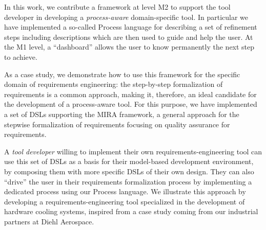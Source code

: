 In this work, we contribute a framework at level M2 to support the tool developer
in developing a \emph{process-aware} domain-specific tool.
In particular we have implemented a so-called \textsf{Process} language for
describing a set of refinement steps including descriptions which are then used to guide and help the user.
At the M1 level, a ``dashboard'' allows the user to know permanently the next step to achieve.

As a case study, we demonstrate how to use this framework for the
specific domain of requirements engineering: the step-by-step formalization of requirements is a common approach,
making it, therefore, an ideal candidate for the development of a process-aware tool.
For this purpose, we have implemented a set of DSLs supporting the MIRA
\cite{MIRA13} framework, a general approach for the stepwise formalization of requirements
focusing on quality assurance for requirements.

A \emph{tool developer} willing to implement their own requirements-engineering
tool can use this set of DSLs as a basis for their model-based development
environment, by composing them with more specific DSLs of their own design.
They can also ``drive'' the user in their requirements formalization process by
implementing a dedicated process using our \textsf{Process} language.
We illustrate this approach by developing a requirements-engineering tool
specialized in the development of hardware cooling systems, inspired
from a case study coming from our industrial partners at Diehl Aerospace.\\



